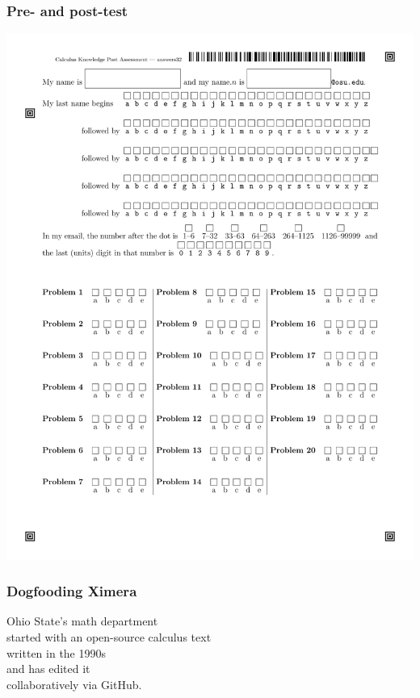\documentclass[14pt]{beamer}
\begin{document}
\begin{frame}
  \frametitle{Pre- and post-test}

  \includegraphics[width=\textwidth]{images/pretest.pdf}
\end{frame}

\begin{frame}
  \large
  \frametitle{Dogfooding Ximera}


  Ohio State's math department \\
  \quad started with an open-source calculus text \\
  \quad\quad written in the 1990s \\
  \quad and has edited it \\
  \quad\quad collaboratively via GitHub.

\end{frame}
\end{document}

